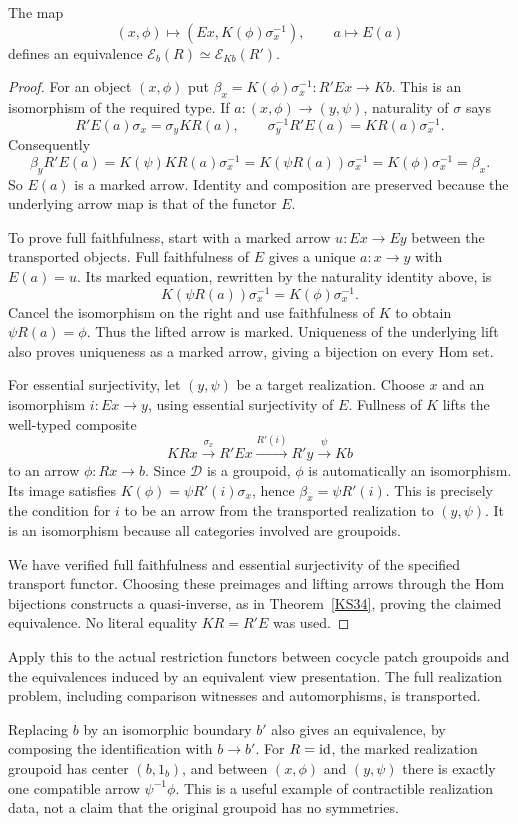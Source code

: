 \begin{theorem}\label{KS39}
The map
\[
 (x,\phi)\longmapsto(Ex,K(\phi)\sigma_x^{-1}),\qquad a\longmapsto E(a)
\]
defines an equivalence \(\mathcal E_b(R)\simeq\mathcal E_{Kb}(R')\).
\end{theorem}
\begin{proof}
For an object $(x,\phi)$ put $\beta_x=K(\phi)\sigma_x^{-1}:R'Ex\to Kb$. This is an isomorphism of the required type. If $a:(x,\phi)\to(y,\psi)$, naturality of $\sigma$ says
\[
 R'E(a)\sigma_x=\sigma_yKR(a),
 \qquad \sigma_y^{-1}R'E(a)=KR(a)\sigma_x^{-1}.
\]
Consequently
\[
 \beta_yR'E(a)
 =K(\psi)KR(a)\sigma_x^{-1}
 =K(\psi R(a))\sigma_x^{-1}
 =K(\phi)\sigma_x^{-1}=\beta_x.
\]
So $E(a)$ is a marked arrow. Identity and composition are preserved because the underlying arrow map is that of the functor $E$.

To prove full faithfulness, start with a marked arrow $u:Ex\to Ey$ between the transported objects. Full faithfulness of $E$ gives a unique $a:x\to y$ with $E(a)=u$. Its marked equation, rewritten by the naturality identity above, is
\[
 K(\psi R(a))\sigma_x^{-1}=K(\phi)\sigma_x^{-1}.
\]
Cancel the isomorphism on the right and use faithfulness of $K$ to obtain $\psi R(a)=\phi$. Thus the lifted arrow is marked. Uniqueness of the underlying lift also proves uniqueness as a marked arrow, giving a bijection on every Hom set.

For essential surjectivity, let $(y,\psi)$ be a target realization. Choose $x$ and an isomorphism $i:Ex\to y$, using essential surjectivity of $E$. Fullness of $K$ lifts the well-typed composite
\[
 KRx\xrightarrow{\sigma_x}R'Ex
 \xrightarrow{R'(i)}R'y\xrightarrow{\psi}Kb
\]
to an arrow $\phi:Rx\to b$. Since $\mathcal D$ is a groupoid, $\phi$ is automatically an isomorphism. Its image satisfies $K(\phi)=\psi R'(i)\sigma_x$, hence $\beta_x=\psi R'(i)$. This is precisely the condition for $i$ to be an arrow from the transported realization to $(y,\psi)$. It is an isomorphism because all categories involved are groupoids.

We have verified full faithfulness and essential surjectivity of the specified transport functor. Choosing these preimages and lifting arrows through the Hom bijections constructs a quasi-inverse, as in Theorem~\ref{KS34}, proving the claimed equivalence. No literal equality $KR=R'E$ was used.
\end{proof}
Apply this to the actual restriction functors between cocycle patch groupoids and the equivalences induced by an equivalent view presentation. The full realization problem, including comparison witnesses and automorphisms, is transported.

Replacing \(b\) by an isomorphic boundary \(b'\) also gives an equivalence, by composing the identification with \(b\to b'\). For \(R=\operatorname{id}\), the marked realization groupoid has center \((b,1_b)\), and between \((x,\phi)\) and \((y,\psi)\) there is exactly one compatible arrow \(\psi^{-1}\phi\). This is a useful example of contractible realization data, not a claim that the original groupoid has no symmetries.

